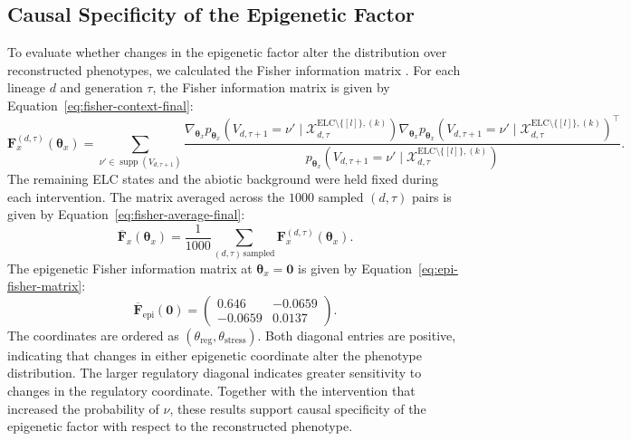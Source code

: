 \documentclass[11pt]{article}
\newcommand{\ELC}{\mathrm{ELC}}
\begin{document}
\subsection{Causal Specificity of the Epigenetic Factor}
To evaluate whether changes in the epigenetic factor alter the distribution over reconstructed phenotypes, we calculated the Fisher information matrix \cite{fisher1925,amari2016,griffiths2015,griffiths2017genetic}. For each lineage $d$ and generation $\tau$, the Fisher information matrix is given by Equation~\ref{eq:fisher-context-final}:
\begin{equation}
\mathbf{F}_x^{(d,\tau)}(\boldsymbol{\theta}_x)
=
\sum_{\nu'\in\operatorname{supp}(V_{d,\tau+1})}
\frac{
\nabla_{\boldsymbol{\theta}_x}
p_{\boldsymbol{\theta}_x}\left(
V_{d,\tau+1}=\nu'
\mid
\mathcal{X}^{\ELC\setminus\{[l]\},(k)}_{d,\tau}
\right)
\nabla_{\boldsymbol{\theta}_x}
p_{\boldsymbol{\theta}_x}\left(
V_{d,\tau+1}=\nu'
\mid
\mathcal{X}^{\ELC\setminus\{[l]\},(k)}_{d,\tau}
\right)^\top
}{
p_{\boldsymbol{\theta}_x}\left(
V_{d,\tau+1}=\nu'
\mid
\mathcal{X}^{\ELC\setminus\{[l]\},(k)}_{d,\tau}
\right)
}.
\label{eq:fisher-context-final}
\end{equation}
The remaining ELC states and the abiotic background were held fixed during each intervention. The matrix averaged across the $1000$ sampled $(d,\tau)$ pairs is given by Equation~\ref{eq:fisher-average-final}:
\begin{equation}
\overline{\mathbf{F}}_x(\boldsymbol{\theta}_x)
=
\frac{1}{1000}
\sum_{(d,\tau)\,\mathrm{sampled}}
\mathbf{F}_x^{(d,\tau)}(\boldsymbol{\theta}_x).
\label{eq:fisher-average-final}
\end{equation}
The epigenetic Fisher information matrix at $\boldsymbol{\theta}_x=\mathbf{0}$ is given by Equation~\ref{eq:epi-fisher-matrix}:
\begin{equation}
\overline{\mathbf{F}}_{\mathrm{epi}}(\mathbf{0})
=
\begin{pmatrix}
0.646 & -0.0659\\
-0.0659 & 0.0137
\end{pmatrix}.
\label{eq:epi-fisher-matrix}
\end{equation}
The coordinates are ordered as $(\theta_{\mathrm{reg}},\theta_{\mathrm{stress}})$. Both diagonal entries are positive, indicating that changes in either epigenetic coordinate alter the phenotype distribution. The larger regulatory diagonal indicates greater sensitivity to changes in the regulatory coordinate. Together with the intervention that increased the probability of $\nu$, these results support causal specificity of the epigenetic factor with respect to the reconstructed phenotype.
\end{document}
